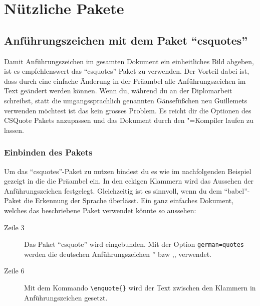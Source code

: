 %
%

\chapter{Nützliche Pakete}

\section{Anführungszeichen mit dem Paket \enquote{csquotes}}
\label{sec:anfuehrungszeichen}

Damit Anführungszeichen im gesamten Dokument ein einheitliches Bild abgeben, ist es empfehlenswert das \enquote{csquotes} Paket zu verwenden. Der Vorteil dabei ist, dass durch eine einfache Änderung in der Präambel alle Anführungszeichen im Text geändert werden können. Wenn du, während du an der Diplomarbeit schreibst, statt die umgangssprachlich genannten Gänsefüßchen neu Guillemets verwenden möchtest ist das kein grosses Problem. Es reicht dir die Optionen des CSQuote Pakets anzupassen und das Dokument durch den \DMLLaTeX"=Kompiler laufen zu lassen.

\subsection{Einbinden des Pakets}

Um das \enquote{csquotes}-Paket zu nutzen bindest du es wie im nachfolgenden Beispiel gezeigt in die die Präambel ein. In den eckigen Klammern wird das Aussehen der Anführungszeichen festgelegt. Gleichzeitig ist es sinnvoll, wenn du dem \enquote{babel}-Paket die Erkennung der Sprache überlässt. Ein ganz einfaches Dokument, welches das beschriebene Paket verwendet könnte so aussehen:



\begin{description}
\item[Zeile 3] Das Paket \enquote{csquote} wird eingebunden. Mit der Option \texttt{german=quotes} werden die deutschen Anführungszeichen '' bzw ,, verwendet.
\item[Zeile 6] Mit dem Kommando \texttt{\textbackslash enquote\{\}} wird der Text zwischen den Klammern in Anführungszeichen gesetzt.
\end{description}

